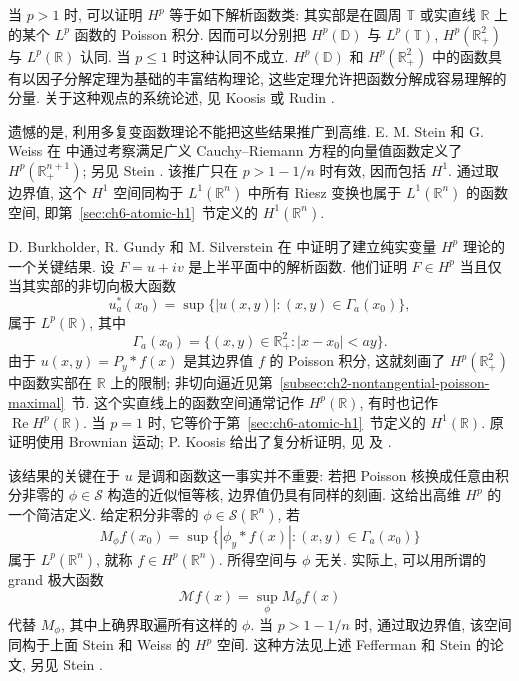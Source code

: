 当 $p>1$ 时, 可以证明 $H^p$ 等于如下解析函数类: 其实部是在圆周 $\mathbb T$ 或实直线 $\mathbb R$ 上的某个 $L^p$ 函数的 Poisson 积分. 因而可以分别把 $H^p(\mathbb D)$ 与 $L^p(\mathbb T)$, $H^p(\mathbb R_+^2)$ 与 $L^p(\mathbb R)$ 认同. 当 $p\le1$ 时这种认同不成立. $H^p(\mathbb D)$ 和 $H^p(\mathbb R_+^2)$ 中的函数具有以因子分解定理为基础的丰富结构理论, 这些定理允许把函数分解成容易理解的分量. 关于这种观点的系统论述, 见 Koosis  或 Rudin .

遗憾的是, 利用多复变函数理论不能把这些结果推广到高维. E. M. Stein 和 G. Weiss 在  中通过考察满足广义 Cauchy--Riemann 方程的向量值函数定义了 $H^p(\mathbb R_+^{n+1})$; 另见 Stein . 该推广只在 $p>1-1/n$ 时有效, 因而包括 $H^1$. 通过取边界值, 这个 $H^1$ 空间同构于 $L^1(\mathbb R^n)$ 中所有 Riesz 变换也属于 $L^1(\mathbb R^n)$ 的函数空间, 即第~\ref{sec:ch6-atomic-h1}~节定义的 $H^1(\mathbb R^n)$.

\hypertarget{chapter-06-page-139}{}
D. Burkholder, R. Gundy 和 M. Silverstein 在  中证明了建立纯实变量 $H^p$ 理论的一个关键结果. 设 $F=u+iv$ 是上半平面中的解析函数. 他们证明 $F\in H^p$ 当且仅当其实部的非切向极大函数
\[
 u_a^*(x_0)=\sup\{|u(x,y)|:(x,y)\in\Gamma_a(x_0)\},
\]
属于 $L^p(\mathbb R)$, 其中
\[
 \Gamma_a(x_0)=\{(x,y)\in\mathbb R_+^2:|x-x_0|<ay\}.
\]
由于 $u(x,y)=P_y*f(x)$ 是其边界值 $f$ 的 Poisson 积分, 这就刻画了 $H^p(\mathbb R_+^2)$ 中函数实部在 $\mathbb R$ 上的限制; 非切向逼近见第~\ref{subsec:ch2-nontangential-poisson-maximal}~节. 这个实直线上的函数空间通常记作 $H^p(\mathbb R)$, 有时也记作 $\operatorname{Re}H^p(\mathbb R)$. 当 $p=1$ 时, 它等价于第~\ref{sec:ch6-atomic-h1}~节定义的 $H^1(\mathbb R)$. 原证明使用 Brownian 运动; P. Koosis 给出了复分析证明, 见  及 .

该结果的关键在于 $u$ 是调和函数这一事实并不重要: 若把 Poisson 核换成任意由积分非零的 $\phi\in\mathcal S$ 构造的近似恒等核, 边界值仍具有同样的刻画. 这给出高维 $H^p$ 的一个简洁定义. 给定积分非零的 $\phi\in\mathcal S(\mathbb R^n)$, 若
\[
 M_\phi f(x_0)=\sup\{|\phi_y*f(x)|:(x,y)\in\Gamma_a(x_0)\}
\]
属于 $L^p(\mathbb R^n)$, 就称 $f\in H^p(\mathbb R^n)$. 所得空间与 $\phi$ 无关. 实际上, 可以用所谓的 grand 极大函数
\[
 \mathcal Mf(x)=\sup_\phi M_\phi f(x)
\]
代替 $M_\phi$, 其中上确界取遍所有这样的 $\phi$. 当 $p>1-1/n$ 时, 通过取边界值, 该空间同构于上面 Stein 和 Weiss 的 $H^p$ 空间. 这种方法见上述 Fefferman 和 Stein 的论文, 另见 Stein .

